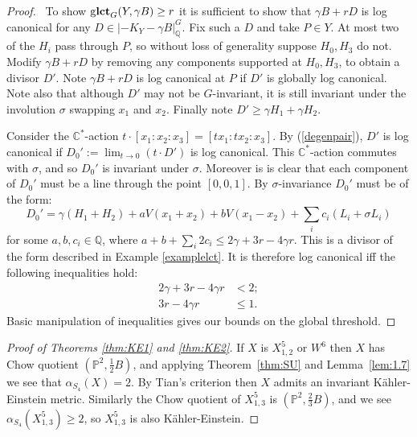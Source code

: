 \documentclass{amsart}
\theoremstyle{definition}
\newcommand{\CC}{\mathbb{C}}
\newcommand{\QQ}{\mathbb{Q}}
\newcommand{\ZZ}{\mathbb{Z}}
\newcommand{\PP}{\mathbb{P}}
\DeclareMathOperator{\glct}{g\bf{lct}}
\begin{document}
\begin{proof} \
To show \(\glct_{G}(Y,\gamma B) \ge r\) it is sufficient to show that \(\gamma B + rD\) is log canonical for any \( D \in |-K_Y - \gamma B|_{\QQ}^G\). Fix such a \(D\) and take \(P \in Y\). At most two of the \(H_i\) pass through \(P\), so without loss of generality suppose \(H_0,H_3\) do not. Modify \(\gamma B+r D\) by removing any components supported at \(H_0,H_3\), to obtain a divisor \(D'\). Note \(\gamma B+r D\) is log canonical at \(P\) if \(D'\) is globally log canonical. Note also that although \(D'\) may not be \(G\)-invariant, it is still invariant under the involution \(\sigma \) swapping \(x_1\) and \(x_2\). Finally note \(D' \ge \gamma H_1 + \gamma H_2\).

Consider the \(\CC^*\)-action \(t \cdot [x_1:x_2:x_3] = [ t x_1: t x_2 : x_3]\). By (\ref{degenpair}), \(D'\) is log canonical if \(D_0' := \lim_{t \to 0} \left( t \cdot D' \right) \) is log canonical. This \(\CC^*\)-action commutes with \(\sigma \), and so \(D_0'\) is invariant under \(\sigma\). Moreover is is clear that each component of \(D_0'\) must be a line through the point \([0,0,1]\). By \(\sigma\)-invariance \(D_0'\) must be of the form:
\[
D_0' = \gamma (H_1+H_2) + a V (x_1+x_2) + b V(x_1-x_2) + \sum_i c_i (L_i + \sigma L_i)
\]
for some \(a,b,c_i \in \QQ\), where \(a + b + \sum_i 2 c_i \le 2 \gamma + 3 r - 4 \gamma r\). This is a divisor of the form described in Example \ref{examplelct}. It is therefore log canonical iff the following inequalities hold:
\begin{align*}
2\gamma + 3 r - 4\gamma r &< 2; \\
3 r - 4\gamma r &\le 1.
\end{align*}
Basic manipulation of inequalities gives our bounds on the global threshold.
\end{proof}
\begin{proof}[Proof of Theorems \ref{thm:KE1} and \ref{thm:KE2}]
If \(X\) is \(X_{1,2}^5\) or \(W^6\) then \(X\) has Chow quotient \((\PP^2,\frac{1}{2}B)\), and applying Theorem~\ref{thm:SU} and Lemma~\ref{lem:1.7} we see that \(\alpha_{S_4}(X) = 2\). By Tian's criterion then \(X\) admits an invariant K\"ahler-Einstein metric. Similarly the Chow quotient of \(X_{1,3}^5\) is \((\PP^2,\frac{2}{3}B)\), and we see \(\alpha_{S_4}(X_{1,3}^5) \ge 2\), so \(X_{1,3}^5\) is also K\"ahler-Einstein.
\end{proof}


\end{document}
